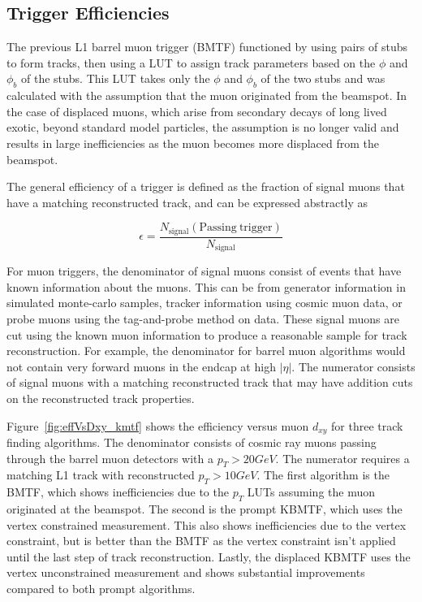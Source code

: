 \subsection{Trigger Efficiencies} \label{sec:kmtf_eff}
The previous L1 barrel muon trigger (BMTF) functioned by using pairs of stubs to form tracks, then using a LUT to assign track parameters based on the $\phi$ and $\phi_b$ of the stubs. This LUT takes only the $\phi$ and $\phi_b$ of the two stubs and was calculated with the assumption that the muon originated from the beamspot. In the case of displaced muons, which arise from secondary decays of long lived exotic, beyond standard model particles, the assumption is no longer valid and results in large inefficiencies as the muon becomes more displaced from the beamspot.

The general efficiency of a trigger is defined as the fraction of signal muons that have a matching reconstructed track, and can be expressed abstractly as

\begin{equation}\label{eq:eff}
	\epsilon=\frac{N_\mathrm{signal}(\mathrm{Passing\ trigger})}{N_\mathrm{signal}}	
\end{equation}

For muon triggers, the denominator of signal muons consist of events that have known information about the muons. This can be from generator information in simulated monte-carlo samples, tracker information using cosmic muon data, or probe muons using the tag-and-probe method on data. These signal muons are cut using the known muon information to produce a reasonable sample for track reconstruction. For example, the denominator for barrel muon algorithms would not contain very forward muons in the endcap at high $|\eta|$. The numerator consists of signal muons with a matching reconstructed track that may have addition cuts on the reconstructed track properties.

Figure~\ref{fig:effVsDxy_kmtf} shows the efficiency versus muon $d_{xy}$ for three track finding algorithms. The denominator consists of cosmic ray muons passing through the barrel muon detectors with a $p_T>20\unit{GeV}$. The numerator requires a matching L1 track with reconstructed $p_T>10\unit{GeV}$. The first algorithm is the BMTF, which shows inefficiencies due to the $p_T$ LUTs assuming the muon originated at the beamspot. The second is the prompt KBMTF, which uses the vertex constrained measurement. This also shows inefficiencies due to the vertex constraint, but is better than the BMTF as the vertex constraint isn't applied until the last step of track reconstruction. Lastly, the displaced KBMTF uses the vertex unconstrained measurement and shows substantial improvements compared to both prompt algorithms.

